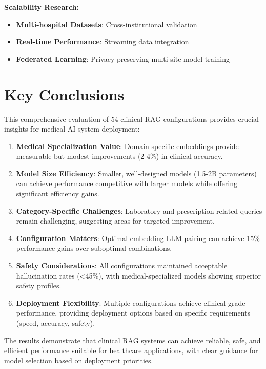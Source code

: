 \textbf{Scalability Research:}
\begin{itemize}
    \item \textbf{Multi-hospital Datasets}: Cross-institutional validation
    \item \textbf{Real-time Performance}: Streaming data integration
    \item \textbf{Federated Learning}: Privacy-preserving multi-site model training
\end{itemize}

\section{Key Conclusions}

This comprehensive evaluation of 54 clinical RAG configurations provides crucial insights for medical AI system deployment:

\begin{enumerate}
    \item \textbf{Medical Specialization Value}: Domain-specific embeddings provide measurable but modest improvements (2-4\%) in clinical accuracy.
    
    \item \textbf{Model Size Efficiency}: Smaller, well-designed models (1.5-2B parameters) can achieve performance competitive with larger models while offering significant efficiency gains.
    
    \item \textbf{Category-Specific Challenges}: Laboratory and prescription-related queries remain challenging, suggesting areas for targeted improvement.
    
    \item \textbf{Configuration Matters}: Optimal embedding-LLM pairing can achieve 15\% performance gains over suboptimal combinations.
    
    \item \textbf{Safety Considerations}: All configurations maintained acceptable hallucination rates (\textless45\%), with medical-specialized models showing superior safety profiles.
    
    \item \textbf{Deployment Flexibility}: Multiple configurations achieve clinical-grade performance, providing deployment options based on specific requirements (speed, accuracy, safety).
\end{enumerate}

The results demonstrate that clinical RAG systems can achieve reliable, safe, and efficient performance suitable for healthcare applications, with clear guidance for model selection based on deployment priorities.